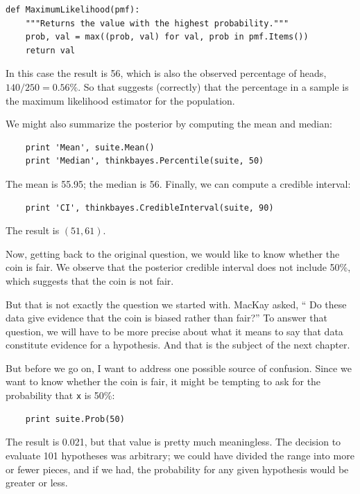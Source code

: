 \documentclass[12pt]{book}
\begin{document}
\begin{verbatim}
def MaximumLikelihood(pmf):
    """Returns the value with the highest probability."""
    prob, val = max((prob, val) for val, prob in pmf.Items())
    return val
\end{verbatim}

In this case the result is 56, which is also the observed percentage of
heads, $140/250 = 0.56\%$.  So that suggests (correctly) that the
percentage in a sample is the maximum likelihood estimator
for the population.

We might also summarize the posterior by computing the mean
and median:

\begin{verbatim}
    print 'Mean', suite.Mean()
    print 'Median', thinkbayes.Percentile(suite, 50)
\end{verbatim}

The mean is 55.95; the median is 56.  Finally, we can compute a
credible interval: 

\begin{verbatim}
    print 'CI', thinkbayes.CredibleInterval(suite, 90)
\end{verbatim}

The result is $(51, 61)$.

Now, getting back to the original question,
we would like to know whether the coin is fair.  We observe
that the posterior credible interval does not include 50\%,
which suggests that the coin is not fair.

But that is not exactly the question we started with.  MacKay asked,
`` Do these data give evidence that the coin is biased rather than
fair?''  To answer that question, we will have to be more precise
about what it means to say that data constitute evidence for
a hypothesis.  And that is the subject of the next chapter.

But before we go on, I want to address one possible source of confusion.
Since we want to know whether the coin is fair, it might be tempting
to ask for the probability that {\tt x} is 50\%:

\begin{verbatim}
    print suite.Prob(50)
\end{verbatim}

The result is 0.021, but that value is pretty much meaningless.  The
decision to evaluate 101 hypotheses was arbitrary; we could have
divided the range into more or fewer pieces, and if we had, the
probability for any given hypothesis would be greater or less.
\end{document}
